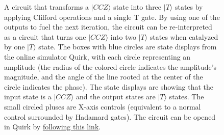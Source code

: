\documentclass[superscriptaddress,notitlepage,longbibliography]{revtex4-1}
\begin{document}
\begin{figure}[ht]
    \label{fig:catalysis-circuit-simple}
    \centering
    \caption{
      A circuit that transforms a $|CCZ\rangle$ state into three $|T\rangle$ states by applying Clifford operations and a single T gate.
      By using one of the outputs to fuel the next iteration, the circuit can be re-interpreted as a circuit that turns one $|CCZ\rangle$ into two $|T\rangle$ states when catalyzed by one $|T\rangle$ state.
      The boxes with blue circles are state displays from the online simulator Quirk, with each circle representing an amplitude (the radius of the colored circle indicates the amplitude's magnitude, and the angle of the line rooted at the center of the circle indicates the phase).
      The state displays are showing that the input state is a $|CCZ\rangle$ and the output states are $|T\rangle$ states.
      The small circled pluses are X-axis controls (equivalent to a normal control surrounded by Hadamard gates).
      The circuit can be opened in Quirk by \href{http://algassert.com/quirk\#circuit=\%7B\%22cols\%22\%3A\%5B\%5B\%22H\%22\%2C\%22H\%22\%2C\%22H\%22\%5D\%2C\%5B\%22\%E2\%80\%A2\%22\%2C\%22\%E2\%80\%A2\%22\%2C\%22Z\%22\%5D\%2C\%5B\%22Amps3\%22\%5D\%2C\%5B\%5D\%2C\%5B1\%2C1\%2C\%22X\%5E-\%C2\%BD\%22\%5D\%2C\%5B\%22X\%22\%2C\%22X\%22\%2C\%22\%E2\%97\%A6\%22\%5D\%2C\%5B\%22Z\%22\%2C\%22Z\%22\%2C\%22\%E2\%8A\%96\%22\%5D\%2C\%5B1\%2C1\%2C\%22Z\%5E-\%C2\%BC\%22\%5D\%2C\%5B\%22Z\%22\%2C\%22Z\%22\%2C\%22\%E2\%8A\%96\%22\%5D\%2C\%5B\%22Amps1\%22\%2C\%22Amps1\%22\%2C\%22Amps1\%22\%5D\%5D\%7D}{following this link}.
    }
\end{figure}
\end{document}
